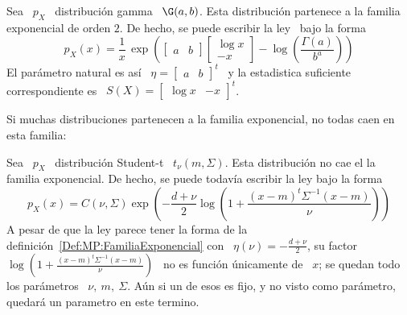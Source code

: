\begin{ejemplo}
  Sea \ $p_X$ \ distribuci\'on gamma \ $\G(a,b)$.  Esta distribuci\'on partenece
  a la familia exponencial  de orden $2$.  De hecho, se puede  escribir la ley \
  bajo la forma
  \[
  p_X(x)     =    \frac{1}{x}    \,     \exp\left(    \begin{bmatrix}     a    &
      b \end{bmatrix} \begin{bmatrix}  \log x \\ - x  \end{bmatrix} - \log\left(
      \frac{\Gamma(a)}{b^a} \right)\right)
  \]
  El   par\'ametro  natural   es   as\'i   \  $\eta   =   \begin{bmatrix}  a   &
    b \end{bmatrix}^t$ \ y la  estadistica suficiente correspondiente es \ $S(X)
  = \begin{bmatrix} \log x & - x \end{bmatrix}^t$.
\end{ejemplo}

Si muchas distribuciones  partenecen a la familia exponencial,  no todas caen en
esta familia:
%
\begin{ejemplo}
  Sea \ $p_X$ \ distribuci\'on  Student-t \ $t_\nu(m,\Sigma)$. Esta distribuci\'on no
  cae el  la familia exponencial. De  hecho, se puede todav\'ia  escribir la ley
  bajo la forma
  \[
  p_X(x)   =  C(\nu,\Sigma)   \exp\left(  -   \frac{d+\nu}{2}  \log\left(   1  +
      \frac{(x-m)^t \Sigma^{-1} (x-m)}{\nu} \right) \right)
  \]
  A    pesar   de    que    la   ley    parece    tener   la    forma   de    la
  definici\'on~\ref{Def:MP:FamiliaExponencial}    con   \    $\eta(\nu)    =   -
  \frac{d+\nu}{2}$,  su  factor  \  $\log\left( 1  +  \frac{(x-m)^t  \Sigma^{-1}
      (x-m)}{\nu} \right)$  \ no es funci\'on  \'unicamente de \  $x$; se quedan
  todo los par\'ametros \ $\nu, \: m, \: \Sigma$. A\'un si un de esos es fijo, y
  no visto como par\'ametro, quedar\'a un parametro en este termino.
\end{ejemplo}

